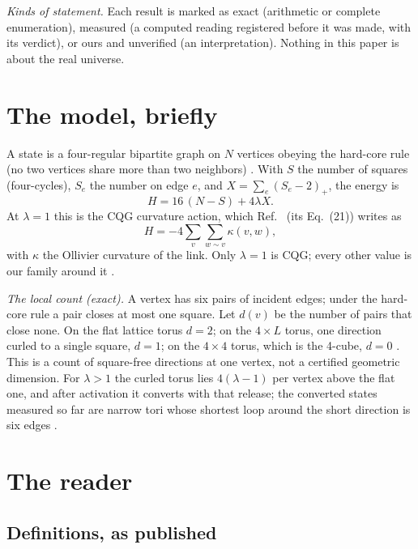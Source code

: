 \documentclass[aps,pre,10pt,twocolumn,superscriptaddress,nofootinbib]{revtex4-2}
\begin{document}
\emph{Kinds of statement.} Each result is marked as exact (arithmetic or complete enumeration), measured (a computed
reading registered before it was made, with its verdict), or ours and unverified (an interpretation). Nothing in
this paper is about the real universe.

\section{The model, briefly}
\label{sec:toy}

A state is a four-regular bipartite graph on $N$ vertices obeying the hard-core rule (no two vertices share more than
two neighbors) \cite{KTB19,T25}. With $S$ the number of squares (four-cycles), $S_e$ the number on edge $e$, and
$X=\sum_e(S_e-2)_+$, the energy is
\begin{equation}
H = 16\,(N - S) + 4\lambda X .
\label{eq:H}
\end{equation}
At $\lambda=1$ this is the CQG curvature action, which Ref.~\cite{T25} (its Eq.~(21)) writes as
\[
H=-4\sum_v\sum_{w\sim v}\kappa(v,w),
\]
with $\kappa$ the Ollivier curvature of the link. Only $\lambda=1$ is CQG; every other value is our family around it
\cite{paper1}.

\emph{The local count (exact).} A vertex has six pairs of incident edges; under the hard-core rule a pair closes at
most one square. Let $d(v)$ be the number of pairs that close none. On the flat lattice torus $d=2$; on the
$4\times L$ torus, one direction curled to a single square, $d=1$; on the $4\times4$ torus, which is the 4-cube,
$d=0$ \cite{paper1}. This is a count of square-free directions at one vertex, not a certified geometric dimension.
For $\lambda>1$ the curled torus lies $4(\lambda-1)$ per vertex above the flat one, and after activation it converts
with that release; the converted states measured so far are narrow tori whose shortest loop around the short
direction is six edges \cite{paper1}.

\section{The reader}
\label{sec:reader}

\subsection{Definitions, as published}
\end{document}
